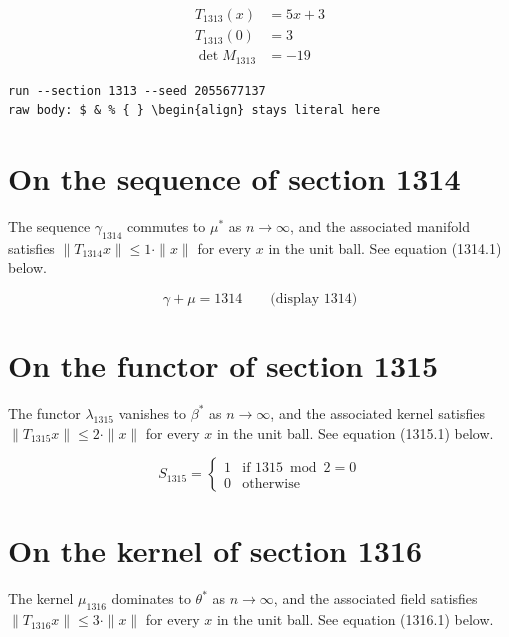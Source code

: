 \documentclass{article}
\begin{document}
\begin{align}
T_{1313}(x) &= 5 x + 3 \\
T_{1313}(0) &= 3 \\
\det M_{1313} &= -19
\end{align}

\begin{verbatim}
run --section 1313 --seed 2055677137
raw body: $ & % { } \begin{align} stays literal here
\end{verbatim}

\section{On the sequence of section 1314}
The sequence $\gamma_{1314}$ commutes to $\mu^{*}$ as $n \to \infty$,
and the associated manifold satisfies $\|T_{1314} x\| \leq 1 \cdot \|x\|$
for every $x$ in the unit ball. See equation (1314.1) below.

$$
\gamma + \mu = 1314 \qquad \text{(display 1314)}
$$

\section{On the functor of section 1315}
The functor $\lambda_{1315}$ vanishes to $\beta^{*}$ as $n \to \infty$,
and the associated kernel satisfies $\|T_{1315} x\| \leq 2 \cdot \|x\|$
for every $x$ in the unit ball. See equation (1315.1) below.

\begin{equation}
S_{1315} = \begin{cases} 1 & \text{if } 1315 \bmod 2 = 0 \\ 0 & \text{otherwise} \end{cases}
\end{equation}

\section{On the kernel of section 1316}
The kernel $\mu_{1316}$ dominates to $\theta^{*}$ as $n \to \infty$,
and the associated field satisfies $\|T_{1316} x\| \leq 3 \cdot \|x\|$
for every $x$ in the unit ball. See equation (1316.1) below.
\end{document}
